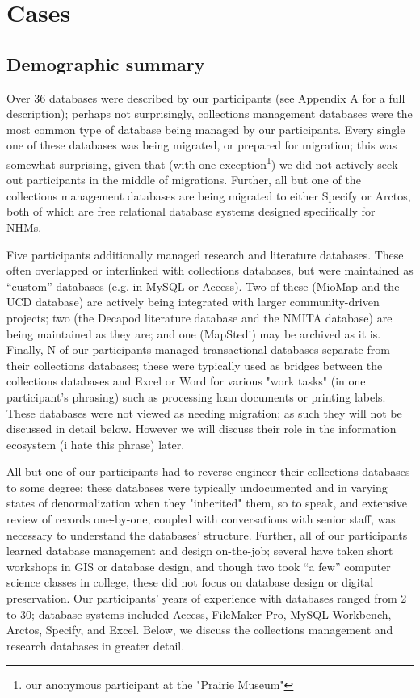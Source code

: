 \section{Cases}

\subsection{Demographic summary}

Over 36 databases were described by our participants (see Appendix A for a full description); perhaps not surprisingly, collections management databases were the most common type of database being managed by our participants. Every single one of these databases was being migrated, or prepared for migration; this was somewhat surprising, given that (with one exception\footnote{our anonymous participant at the "Prairie Museum"}) we did not actively seek out participants in the middle of migrations. Further, all but one of the collections management databases are being migrated to either Specify or Arctos, both of which are free relational database systems designed specifically for NHMs. 

Five participants additionally managed research and literature databases. These often overlapped or interlinked with collections databases, but were maintained as “custom” databases (e.g. in MySQL or Access). Two of these (MioMap and the UCD database) are actively being integrated with larger community-driven projects; two (the Decapod literature database and the NMITA database) are being maintained as they are; and one (MapStedi) may be archived as it is.  Finally, N of our participants managed transactional databases separate from their collections databases; these were typically used as bridges between the collections databases and Excel or Word for various "work tasks" (in one participant's phrasing) such as processing loan documents or printing labels. These databases were not viewed as needing migration; as such they will not be discussed in detail below.  However we will discuss their role in the information ecosystem (i hate this phrase) later.

All but one of our participants had to reverse engineer their collections databases to some degree; these databases were typically undocumented and in varying states of denormalization when they "inherited" them, so to speak, and extensive review of records one-by-one, coupled with conversations with senior staff, was necessary to understand the databases' structure. Further, all of our participants learned database management and design on-the-job; several have taken short workshops in GIS or database design, and though two took “a few” computer science classes in college, these did not focus on database design or digital preservation. Our participants’ years of experience with databases ranged from 2 to 30; database systems included Access, FileMaker Pro, MySQL Workbench, Arctos, Specify, and Excel. Below, we discuss the collections management and research databases in greater detail.

